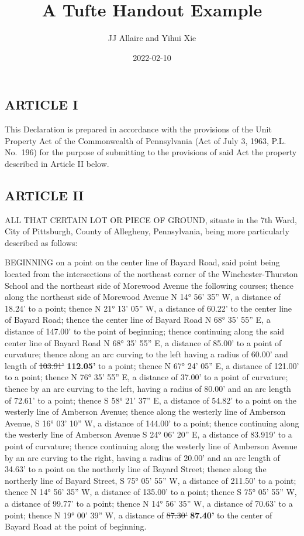 \documentclass[]{tufte-handout}
\title[Tufte Handout with R Markdown]{A Tufte Handout Example}
\author{JJ Allaire and Yihui Xie}
\date{2022-02-10}
\begin{document}
\maketitle




\hypertarget{article-i}{%
\subsection*{ARTICLE I}\label{article-i}}

This Declaration is prepared in accordance with the provisions of the
Unit Property Act of the Commonwealth of Pennsylvania (Act of July 3,
1963, P.L. No.~196) for the purpose of submitting to the provisions of
said Act the property described in Article II below.

\hypertarget{article-ii}{%
\subsection*{ARTICLE II}\label{article-ii}}

ALL THAT CERTAIN LOT OR PIECE OF GROUND, situate in the 7th Ward, City
of Pittsburgh, County of Allegheny, Pennsylvania, being more
particularly described as follows:

BEGINNING on a point on the center line of Bayard Road, said point being
located from the intersections of the northeast corner of the
Winchester-Thurston School and the northeast side of Morewood Avenue the
following courses; thence along the northeast side of Morewood Avenue N
14° 56' 35'' W, a distance of 18.24' to a point; thence N 21° 13' 05''
W, a distance of 60.22' to the center line of Bayard Road; thence the
center line of Bayard Road N 68° 35' 55'' E, a distance of 147.00' to
the point of beginning; thence continuing along the said center line of
Bayard Road N 68° 35' 55'' E, a distance of 85.00' to a point of
curvature; thence along an arc curving to the left having a radius of
60.00' and length of \sout{103.91'} \textbf{112.05'} to a point; thence
N 67° 24' 05'' E, a distance of 121.00' to a point; thence N 76° 35'
55'' E, a distance of 37.00' to a point of curvature; thence by an arc
curving to the left, having a radius of 80.00' and an arc length of
72.61' to a point; thence S 58° 21' 37'' E, a distance of 54.82' to a
point on the westerly line of Amberson Avenue; thence along the westerly
line of Amberson Avenue, S 16° 03' 10'' W, a distance of 144.00' to a
point; thence continuing along the westerly line of Amberson Avenue S
24° 06' 20'' E, a distance of 83.919' to a point of curvature; thence
continuing along the westerly line of Amberson Avenue by an arc curving
to the right, having a radius of 20.00' and an arc length of 34.63' to a
point on the northerly line of Bayard Street; thence along the northerly
line of Bayard Street, S 75° 05' 55'' W, a distance of 211.50' to a
point; thence N 14° 56' 35'' W, a distance of 135.00' to a point; thence
S 75° 05' 55'' W, a distance of 99.77' to a point; thence N 14° 56' 35''
W, a distance of 70.63' to a point; thence N 19° 00' 39'' W, a distance
of \sout{87.30'} \textbf{87.40'} to the center of Bayard Road at the
point of beginning.
\end{document}
